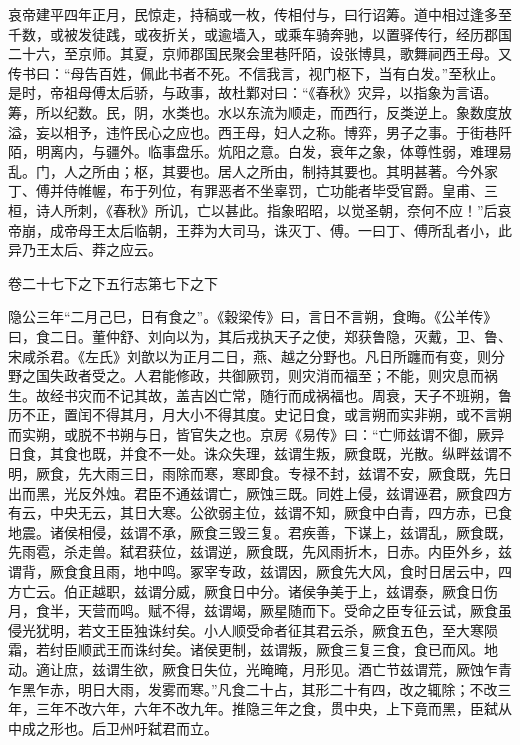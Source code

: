 \documentclass[12pt,UTF8]{ctexbook}
\begin{document}
哀帝建平四年正月，民惊走，持稿或一枚，传相付与，曰行诏筹。道中相过逢多至千数，或被发徒践，或夜折关，或逾墙入，或乘车骑奔驰，以置驿传行，经历郡国二十六，至京师。其夏，京师郡国民聚会里巷阡陌，设张博具，歌舞祠西王母。又传书曰：“母告百姓，佩此书者不死。不信我言，视门枢下，当有白发。”至秋止。是时，帝祖母傅太后骄，与政事，故杜鄴对曰：“《春秋》灾异，以指象为言语。筹，所以纪数。民，阴，水类也。水以东流为顺走，而西行，反类逆上。象数度放溢，妄以相予，违忤民心之应也。西王母，妇人之称。博弈，男子之事。于街巷阡陌，明离内，与疆外。临事盘乐。炕阳之意。白发，衰年之象，体尊性弱，难理易乱。门，人之所由；枢，其要也。居人之所由，制持其要也。其明甚著。今外家丁、傅并侍帷幄，布于列位，有罪恶者不坐辜罚，亡功能者毕受官爵。皇甫、三桓，诗人所刺，《春秋》所讥，亡以甚此。指象昭昭，以觉圣朝，奈何不应！”后哀帝崩，成帝母王太后临朝，王莽为大司马，诛灭丁、傅。一曰丁、傅所乱者小，此异乃王太后、莽之应云。





卷二十七下之下五行志第七下之下



隐公三年“二月己巳，日有食之”。《穀梁传》曰，言日不言朔，食晦。《公羊传》曰，食二日。董仲舒、刘向以为，其后戎执天子之使，郑获鲁隐，灭戴，卫、鲁、宋咸杀君。《左氏》刘歆以为正月二日，燕、越之分野也。凡日所躔而有变，则分野之国失政者受之。人君能修政，共御厥罚，则灾消而福至；不能，则灾息而祸生。故经书灾而不记其故，盖吉凶亡常，随行而成祸福也。周衰，天子不班朔，鲁历不正，置闰不得其月，月大小不得其度。史记日食，或言朔而实非朔，或不言朔而实朔，或脱不书朔与日，皆官失之也。京房《易传》曰：“亡师兹谓不御，厥异日食，其食也既，并食不一处。诛众失理，兹谓生叛，厥食既，光散。纵畔兹谓不明，厥食，先大雨三日，雨除而寒，寒即食。专禄不封，兹谓不安，厥食既，先日出而黑，光反外烛。君臣不通兹谓亡，厥蚀三既。同姓上侵，兹谓诬君，厥食四方有云，中央无云，其日大寒。公欲弱主位，兹谓不知，厥食中白青，四方赤，已食地震。诸侯相侵，兹谓不承，厥食三毁三复。君疾善，下谋上，兹谓乱，厥食既，先雨雹，杀走兽。弑君获位，兹谓逆，厥食既，先风雨折木，日赤。内臣外乡，兹谓背，厥食食且雨，地中鸣。冢宰专政，兹谓因，厥食先大风，食时日居云中，四方亡云。伯正越职，兹谓分威，厥食日中分。诸侯争美于上，兹谓泰，厥食日伤月，食半，天营而鸣。赋不得，兹谓竭，厥星随而下。受命之臣专征云试，厥食虽侵光犹明，若文王臣独诛纣矣。小人顺受命者征其君云杀，厥食五色，至大寒陨霜，若纣臣顺武王而诛纣矣。诸侯更制，兹谓叛，厥食三复三食，食已而风。地动。適让庶，兹谓生欲，厥食日失位，光晻晻，月形见。酒亡节兹谓荒，厥蚀乍青乍黑乍赤，明日大雨，发雾而寒。”凡食二十占，其形二十有四，改之辄除；不改三年，三年不改六年，六年不改九年。推隐三年之食，贯中央，上下竟而黑，臣弑从中成之形也。后卫州吁弑君而立。
\end{document}
